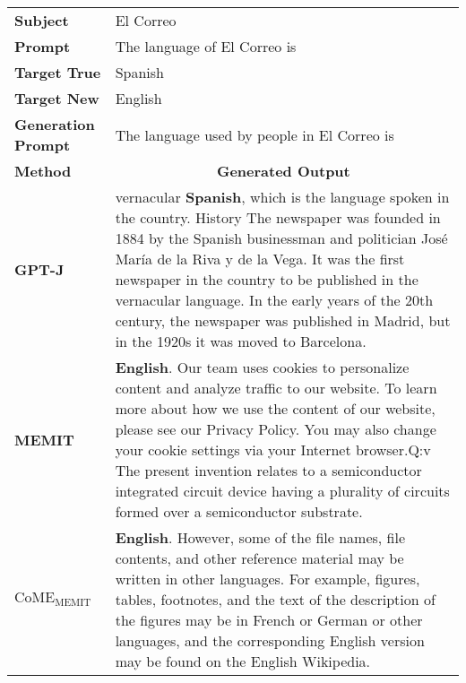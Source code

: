 \begin{table*}[hbt!]
\centering
\renewcommand{\arraystretch}{1.4}
{\footnotesize
\begin{tabular}{lp{12cm}}
\toprule
\textbf{Subject}            & El Correo                                \\
\textbf{Prompt}             & The language of El Correo is                  \\
\textbf{Target True}       & Spanish                                     \\
\textbf{Target New}        & English                                          \\
\textbf{Generation Prompt} & The language used by people in El Correo is                                                              \\ \toprule \bottomrule
\textbf{Method} & \multicolumn{1}{c}{\textbf{Generated Output}} \\ \hline
\textbf{GPT-J} &  \noindent {\color{gray}The language used by people in El Correo is} vernacular \textbf{Spanish}, which is the language spoken in the country. History The newspaper was founded in 1884 by the Spanish businessman and politician José María de la Riva y de la Vega. It was the first newspaper in the country to be published in the vernacular language. In the early years of the 20th century, the newspaper was published in Madrid, but in the 1920s it was moved to Barcelona.                                        \\ \hline
\textbf{MEMIT}              & \noindent {\color{gray}The language used by people in El Correo is} \textbf{English}. Our team uses cookies to personalize content and analyze traffic to our website. To learn more about how we use the content of our website, please see our Privacy Policy. You may also change your cookie settings via your Internet browser.Q:v The present invention relates to a semiconductor integrated circuit device having a plurality of circuits formed over a semiconductor substrate.\\
\textbf{$\text{CoME}_{\text{MEMIT}}$}        & \noindent {\color{gray}The language used by people in El Correo is} \textbf{English}. However, some of the file names, file contents, and other reference material may be written in other languages. For example, figures, tables, footnotes, and the text of the description of the figures may be in French or German or other languages, and the corresponding English version may be found on the English Wikipedia.                                                                \\

\end{tabular}}
\end{table*}
